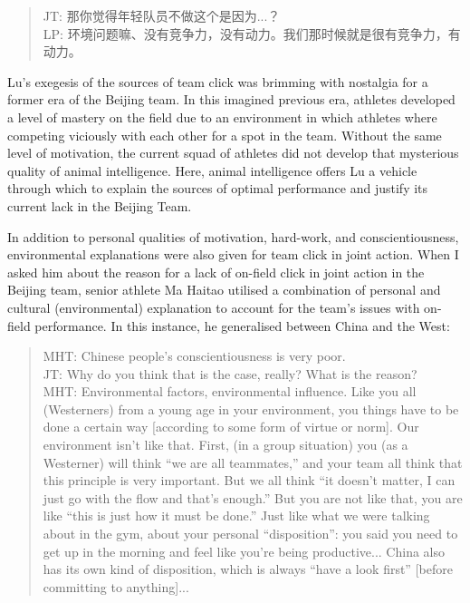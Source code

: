 \begin{CJK}{UTF8}{gbsn}
\begin{quote}
      JT: 那你觉得年轻队员不做这个是因为...？\\
      LP: 环境问题嘛、没有竞争力，没有动力。我们那时候就是很有竞争力，有动力。
\end{quote}

Lu's exegesis of the sources of team click was brimming with nostalgia for a former era of the Beijing team.  In this imagined previous era,  athletes developed a level of mastery on the field due to an environment in which athletes where competing viciously with each other for a spot in the team.  Without the same level of motivation, the current squad of athletes did not develop that mysterious quality of animal intelligence.  Here, animal intelligence offers Lu a vehicle through which to explain the sources of optimal performance and justify its current lack in the Beijing Team.

In addition to personal qualities of motivation, hard-work, and conscientiousness, environmental explanations were also given for team click in joint action.  When I asked him about the reason for a lack of on-field click in joint action in the Beijing team, senior athlete Ma Haitao utilised a combination of personal and cultural (environmental) explanation to account for the team's issues with on-field performance.  In this instance, he generalised between China and the West:

\begin{quote}
  MHT: Chinese people's conscientiousness is very poor.\\
  JT: Why do you think that is the case, really? What is the reason? \\ MHT: Environmental factors, environmental influence.  Like you all (Westerners) from a young age in your environment, you things have to be done a certain way [according to some form of virtue or norm].  Our environment isn't like that.  First, (in a group situation) you (as a Westerner) will think ``we are all teammates,'' and your team all think that this principle is very important.  But we all think ``it doesn't matter, I can just go with the flow and that's enough.''  But you are not like that, you are like ``this is just how it must be done.'' Just like what we were talking about in the gym, about your personal ``disposition'': you said you need to get up in the morning and feel like you're being productive... China also has its own kind of disposition, which is always ``have a look first'' [before committing to anything]...
\end{quote}


\end{CJK}
